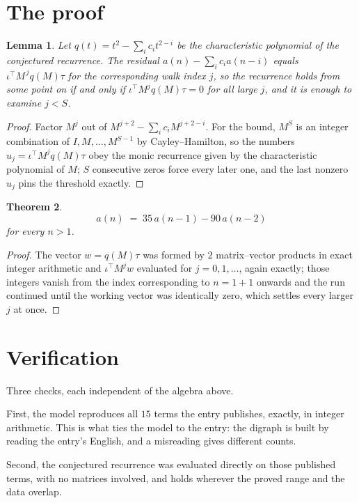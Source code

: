 \documentclass[11pt,a4paper]{article}
\theoremstyle{plain}
\newtheorem{theorem}{Theorem}
\newtheorem{lemma}[theorem]{Lemma}
\theoremstyle{definition}
\begin{document}
\section{The proof}

\begin{lemma}\label{lem:crit}
Let $q(t)=t^{2}-\sum_i c_it^{2-i}$ be the characteristic polynomial of the
conjectured recurrence. The residual $a(n)-\sum_ic_ia(n-i)$ equals
$\iota^{\!\top}M^{\,j}q(M)\tau$ for the corresponding walk index $j$, so the recurrence
holds from some point on if and only if $\iota^{\!\top}M^{j}q(M)\tau=0$ for all large $j$,
and it is enough to examine $j<S$.
\end{lemma}

\begin{proof}
Factor $M^{j}$ out of $M^{j+2}-\sum_ic_iM^{j+2-i}$. For the bound, $M^{S}$
is an integer combination of $I,M,\dots,M^{S-1}$ by Cayley--Hamilton, so the numbers
$u_j=\iota^{\!\top}M^{j}q(M)\tau$ obey the monic recurrence given by the characteristic
polynomial of $M$; $S$ consecutive zeros force every later one, and the last nonzero $u_j$
pins the threshold exactly.
\end{proof}

\begin{theorem}
\[
a(n)\;=\;35\,a(n-1) - 90\,a(n-2)
\]
for every $n>1$.
\end{theorem}

\begin{proof}
The vector $w=q(M)\tau$ was formed by $2$ matrix--vector products in exact integer
arithmetic and $\iota^{\!\top}M^{j}w$ evaluated for $j=0,1,\dots$, again exactly; those
integers vanish from the index corresponding to $n=1+1$ onwards and the run continued
until the working vector was identically zero, which settles every larger $j$ at once.
\end{proof}

\section{Verification}

Three checks, each independent of the algebra above.

First, the model reproduces all $15$ terms the entry publishes, exactly, in integer
arithmetic. This is what ties the model to the entry: the digraph is built by reading the
entry's English, and a misreading gives different counts.

Second, the conjectured recurrence was evaluated directly on those published terms, with no
matrices involved, and holds wherever the proved range and the data overlap.
\end{document}

